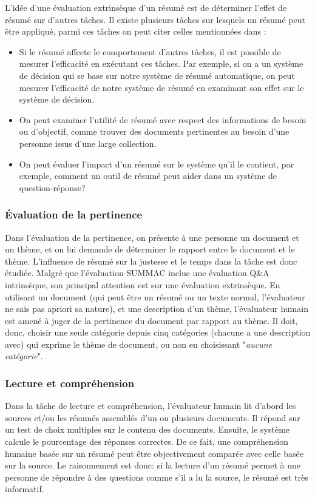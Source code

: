 \documentclass[a4paper,12pt,oneside]{../use/ESIthesis}
\begin{document}
L'idée d'une évaluation extrinsèque d'un résumé est de déterminer l'effet de résumé sur d'autres tâches. 
Il existe plusieurs tâches sur lesquels un résumé peut être appliqué, parmi ces tâches on peut citer celles mentionnées dans \cite{01-mani}:
\begin{itemize}
\item Si le résumé affecte le comportement d'autres tâches, il est possible de mesurer l'efficacité en exécutant ces tâches. 
Par exemple, si on a un système de décision qui se base sur notre système de résumé automatique, on peut mesurer l'efficacité de notre système de résumé en examinant son effet sur le système de décision.
\item On peut examiner l'utilité de résumé avec respect des informations de besoin ou d'objectif, comme trouver des documents pertinentes au besoin d'une personne issus d'une large collection.
\item On peut évaluer l'impact d'un résumé sur le système qu'il le contient, par exemple, comment un outil de résumé peut aider dans un système de question-réponse?
\end{itemize}

\subsubsection{Évaluation de la pertinence}

Dans l'évaluation de la pertinence, on présente à une personne un document et un thème, et on lui demande de déterminer le rapport entre le document et le thème. 
L'influence de résumé sur la justesse et le temps dans la tâche est donc étudiée. 
Malgré que l'évaluation SUMMAC inclue une évaluation Q\&A intrinsèque, son principal attention est sur une évaluation extrinsèque. 
En utilisant un document (qui peut être un résumé ou un texte normal, l'évaluateur ne sais pas apriori sa nature), et une description d'un thème, l'évaluateur humain est amené à juger de la pertinence du document par rapport au thème. 
Il doit, donc, choisir une seule catégorie depuis cinq catégories (chacune a une description avec) qui exprime le thème de document, ou non en choisissant "\textit{aucune catégorie}". 

\subsubsection{Lecture et compréhension}

Dans la tâche de lecture et compréhension, l'évaluateur humain lit d'abord les sources et/ou les résumés assemblés d'un ou plusieurs documents. Il répond sur un test de choix multiples sur le contenu des documents. 
Ensuite, le système calcule le pourcentage des réponses correctes. 
De ce fait, une compréhension humaine basée sur un résumé peut être objectivement comparée avec celle basée sur la source. 
Le raisonnement est donc: si la lecture d'un résumé permet à une personne de répondre à des questions comme s'il a lu la source, le résumé est très informatif.
\end{document}
